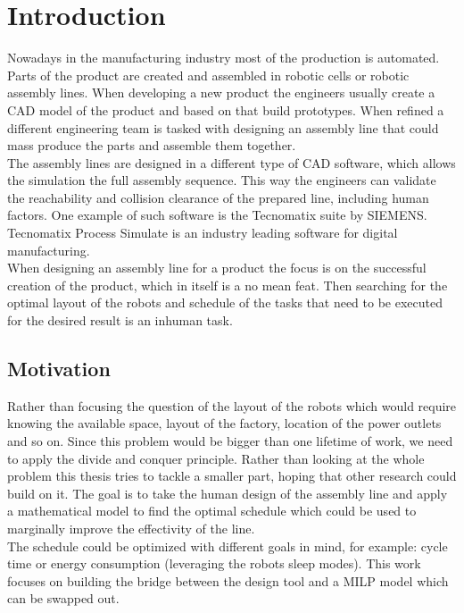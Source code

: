 \chapter{Introduction}
Nowadays in the manufacturing industry most of the production is automated. Parts of the product are created and assembled in robotic cells or robotic assembly lines. When developing a new product the engineers usually create a CAD model of the product and based on that build prototypes. When refined a different engineering team is tasked with designing an assembly line that could mass produce the parts and assemble them together. \\ 

The assembly lines are designed in a different type of CAD software, which allows the simulation the full assembly sequence. This way the engineers can validate the reachability and collision clearance of the prepared line, including human factors. One example of such software is the Tecnomatix suite by SIEMENS. Tecnomatix Process Simulate is an industry leading software for digital manufacturing. \\ 

When designing an assembly line for a product the focus is on the successful creation of the product, which in itself is a no mean feat. Then searching for the optimal layout of the robots and schedule of the tasks that need to be executed for the desired result is an inhuman task. 

\section{Motivation}

Rather than focusing the question of the layout of the robots which would require knowing the available space, layout of the factory, location of the power outlets and so on. Since this problem would be bigger than one lifetime of work, we need to apply the divide and conquer principle. Rather than looking at the whole problem this thesis tries to tackle a smaller part, hoping that other research could build on it. The goal is to take the human design of the assembly line and apply a mathematical model to find the optimal schedule which could be used to marginally improve the effectivity of the line. \\

The schedule could be optimized with different goals in mind, for example: cycle time or energy consumption (leveraging the robots sleep modes). This work focuses on building the bridge between the design tool and a MILP model which can be swapped out. 

